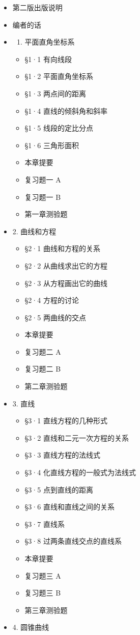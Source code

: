 \begin{itemize}
\item
  第二版出版说明
\item
  编者的话
\item
  \begin{enumerate}
  \def\labelenumi{\arabic{enumi}.}
  \tightlist
  \item
    平面直角坐标系
  \end{enumerate}

  \begin{itemize}
  \tightlist
  \item
    §1·1 有向线段
  \item
    §1·2 平面直角坐标系
  \item
    §1·3 两点间的距离
  \item
    §1·4 直线的倾斜角和斜率
  \item
    §1·5 线段的定比分点
  \item
    §1·6 三角形面积
  \item
    本章提要
  \item
    复习题一 A
  \item
    复习题一 B
  \item
    第一章测验题
  \end{itemize}
\item
  2. 曲线和方程

  \begin{itemize}
  \tightlist
  \item
    §2·1 曲线和方程的关系
  \item
    §2·2 从曲线求出它的方程
  \item
    §2·3 从方程画出它的曲线
  \item
    §2·4 方程的讨论
  \item
    §2·5 两曲线的交点
  \item
    本章提要
  \item
    复习题二 A
  \item
    复习题二 B
  \item
    第二章测验题
  \end{itemize}
\item
  3. 直线

  \begin{itemize}
  \tightlist
  \item
    §3·1 直线方程的几种形式
  \item
    §3·2 直线和二元一次方程的关系
  \item
    §3·3 直线方程的法线式
  \item
    §3·4 化直线方程的一般式为法线式
  \item
    §3·5 点到直线的距离
  \item
    §3·6 直线和直线之间的关系
  \item
    §3·7 直线系
  \item
    §3·8 过两条直线交点的直线系
  \item
    本章提要
  \item
    复习题三 A
  \item
    复习题三 B
  \item
    第三章测验题
  \end{itemize}
\item
  4. 圆锥曲线


\end{itemize}
